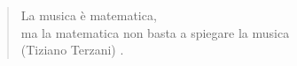 \documentclass[
	a4paper,
	twocolumn
	]{article}
\begin{document}
\begin{quote}
La musica è matematica, \\
ma la matematica non basta a spiegare la musica \\
(Tiziano Terzani) \cite{tizterz}.
\end{quote}
%




\vfill\null

\raggedright


\end{document}
